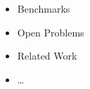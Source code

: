 

\begin{itemize}
\item Benchmarks
\item Open Problems
\item Related Work
\item \ldots
\end{itemize}


